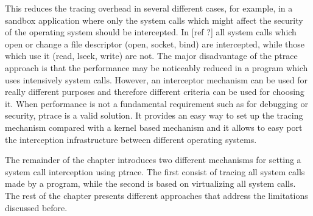 This reduces the tracing overhead in several different cases, for example, in a sandbox application  where only the system calls which might affect the security of the operating system should be intercepted. In [ref ?] all system calls which open or change a file descriptor (open, socket, bind) are intercepted, while those which use it (read, lseek, write) are not. The major disadvantage of the ptrace approach is that the performance may be noticeably reduced in a program which uses intensively system calls.  However, an interceptor mechanism can be used for really different purposes and therefore different criteria can be used for choosing it. When performance is not a fundamental requirement such as for debugging or security, ptrace is a valid solution. It provides an easy way to set up the tracing mechanism compared with a kernel based mechanism and it allows to easy port the interception infrastructure between different operating systems.  

The remainder of the chapter introduces two different mechanisms for setting a system call interception using ptrace. The first consist of tracing all system calls made by a program, while the second is based on virtualizing all system calls. The rest of the chapter presents different approaches that address the limitations discussed before.    \\

%
